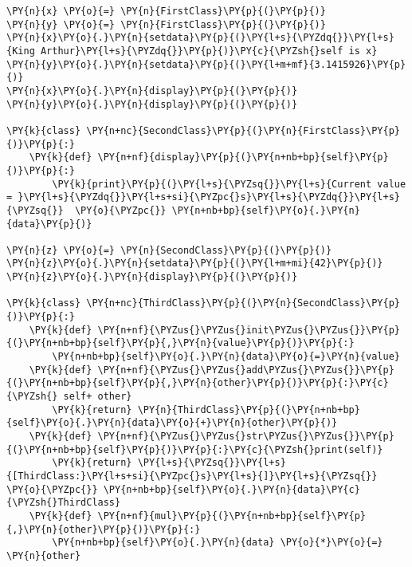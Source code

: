 \begin{Verbatim}[commandchars=\\\{\}]
\PY{n}{x} \PY{o}{=} \PY{n}{FirstClass}\PY{p}{(}\PY{p}{)}
\PY{n}{y} \PY{o}{=} \PY{n}{FirstClass}\PY{p}{(}\PY{p}{)}
\PY{n}{x}\PY{o}{.}\PY{n}{setdata}\PY{p}{(}\PY{l+s}{\PYZdq{}}\PY{l+s}{King Arthur}\PY{l+s}{\PYZdq{}}\PY{p}{)}\PY{c}{\PYZsh{}self is x}
\PY{n}{y}\PY{o}{.}\PY{n}{setdata}\PY{p}{(}\PY{l+m+mf}{3.1415926}\PY{p}{)}
\PY{n}{x}\PY{o}{.}\PY{n}{display}\PY{p}{(}\PY{p}{)}
\PY{n}{y}\PY{o}{.}\PY{n}{display}\PY{p}{(}\PY{p}{)}

\PY{k}{class} \PY{n+nc}{SecondClass}\PY{p}{(}\PY{n}{FirstClass}\PY{p}{)}\PY{p}{:}
    \PY{k}{def} \PY{n+nf}{display}\PY{p}{(}\PY{n+nb+bp}{self}\PY{p}{)}\PY{p}{:}
        \PY{k}{print}\PY{p}{(}\PY{l+s}{\PYZsq{}}\PY{l+s}{Current value = }\PY{l+s}{\PYZdq{}}\PY{l+s+si}{\PYZpc{}s}\PY{l+s}{\PYZdq{}}\PY{l+s}{\PYZsq{}}  \PY{o}{\PYZpc{}} \PY{n+nb+bp}{self}\PY{o}{.}\PY{n}{data}\PY{p}{)}

\PY{n}{z} \PY{o}{=} \PY{n}{SecondClass}\PY{p}{(}\PY{p}{)}
\PY{n}{z}\PY{o}{.}\PY{n}{setdata}\PY{p}{(}\PY{l+m+mi}{42}\PY{p}{)}
\PY{n}{z}\PY{o}{.}\PY{n}{display}\PY{p}{(}\PY{p}{)}

\PY{k}{class} \PY{n+nc}{ThirdClass}\PY{p}{(}\PY{n}{SecondClass}\PY{p}{)}\PY{p}{:}
    \PY{k}{def} \PY{n+nf}{\PYZus{}\PYZus{}init\PYZus{}\PYZus{}}\PY{p}{(}\PY{n+nb+bp}{self}\PY{p}{,}\PY{n}{value}\PY{p}{)}\PY{p}{:}
        \PY{n+nb+bp}{self}\PY{o}{.}\PY{n}{data}\PY{o}{=}\PY{n}{value}
    \PY{k}{def} \PY{n+nf}{\PYZus{}\PYZus{}add\PYZus{}\PYZus{}}\PY{p}{(}\PY{n+nb+bp}{self}\PY{p}{,}\PY{n}{other}\PY{p}{)}\PY{p}{:}\PY{c}{\PYZsh{} self+ other}
        \PY{k}{return} \PY{n}{ThirdClass}\PY{p}{(}\PY{n+nb+bp}{self}\PY{o}{.}\PY{n}{data}\PY{o}{+}\PY{n}{other}\PY{p}{)}
    \PY{k}{def} \PY{n+nf}{\PYZus{}\PYZus{}str\PYZus{}\PYZus{}}\PY{p}{(}\PY{n+nb+bp}{self}\PY{p}{)}\PY{p}{:}\PY{c}{\PYZsh{}print(self)}
        \PY{k}{return} \PY{l+s}{\PYZsq{}}\PY{l+s}{[ThirdClass:}\PY{l+s+si}{\PYZpc{}s}\PY{l+s}{]}\PY{l+s}{\PYZsq{}} \PY{o}{\PYZpc{}} \PY{n+nb+bp}{self}\PY{o}{.}\PY{n}{data}\PY{c}{\PYZsh{}ThirdClass}
    \PY{k}{def} \PY{n+nf}{mul}\PY{p}{(}\PY{n+nb+bp}{self}\PY{p}{,}\PY{n}{other}\PY{p}{)}\PY{p}{:}
        \PY{n+nb+bp}{self}\PY{o}{.}\PY{n}{data} \PY{o}{*}\PY{o}{=} \PY{n}{other}
\end{Verbatim}
